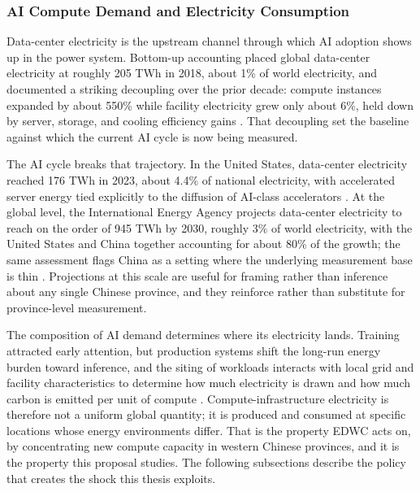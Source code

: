 \documentclass[12pt,a4paper]{article}
\begin{document}
\subsubsection{AI Compute Demand and Electricity Consumption}
%
%

Data-center electricity is the upstream channel through which AI
adoption shows up in the power system. Bottom-up accounting placed
global data-center electricity at roughly 205 TWh in 2018, about 1\%
of world electricity, and documented a striking decoupling over the
prior decade: compute instances expanded by about 550\% while
facility electricity grew only about 6\%, held down by server,
storage, and cooling efficiency gains
\citep{masanetetal-2020-recalibratingglobaldata}. That decoupling set
the baseline against which the current AI cycle is now being measured.

The AI cycle breaks that trajectory. In the United States, data-center
electricity reached 176 TWh in 2023, about 4.4\% of national
electricity, with accelerated server energy tied explicitly to the
diffusion of AI-class accelerators
\citep{shehabietal-2024-2024unitedstates}. At the global level, the
International Energy Agency projects data-center electricity to reach
on the order of 945 TWh by 2030, roughly 3\% of world electricity,
with the United States and China together accounting for about 80\%
of the growth; the same assessment flags China as a setting where the
underlying measurement base is thin \citep{internationalenergyagency-2025-energyai}.
Projections at this scale are useful for framing rather than inference
about any single Chinese province, and they reinforce rather than
substitute for province-level measurement.

The composition of AI demand determines where its electricity lands.
Training attracted early attention, but production systems shift the
long-run energy burden toward inference, and the siting of workloads
interacts with local grid and facility characteristics to determine
how much electricity is drawn and how much carbon is emitted per unit
of compute \citep{pattersonetal-2022-carbonfootprintmachine}.
Compute-infrastructure electricity is therefore not a uniform global
quantity; it is produced and consumed at specific locations whose
energy environments differ. That is the property EDWC acts on, by
concentrating new compute capacity in western Chinese provinces, and
it is the property this proposal studies. The following subsections
describe the policy that creates the shock this thesis exploits.
\end{document}
